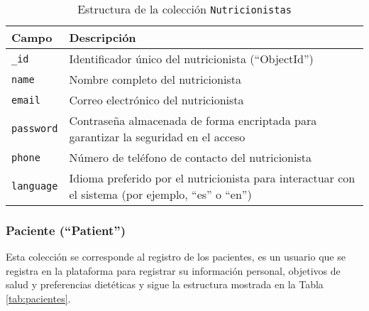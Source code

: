 \begin{table}[t]
    \centering
    \begin{tabular}{|l|p{10cm}|}
        \hline
        \textbf{Campo} & \textbf{Descripción} \\
        \hline
        \texttt{\_id} & Identificador único del nutricionista (``ObjectId'') \\
        \hline
        \texttt{name} & Nombre completo del nutricionista \\
        \hline
        \texttt{email} & Correo electrónico del nutricionista \\
        \hline
        \texttt{password} & Contraseña almacenada de forma encriptada para garantizar la seguridad en el acceso \\
        \hline
        \texttt{phone} & Número de teléfono de contacto del nutricionista \\
        \hline
        \texttt{language} & Idioma preferido por el nutricionista para interactuar con el sistema (por ejemplo, ``es'' o ``en'') \\
        \hline
    \end{tabular}
    \caption{Estructura de la colección \texttt{Nutricionistas}}
    \label{tab:nutritionistas}
\end{table}


\subsubsection{Paciente (``Patient'')}
Esta colección se corresponde al registro de los pacientes, es un usuario que se registra en la plataforma para registrar su información personal, objetivos de salud y preferencias dietéticas y sigue la estructura mostrada en la Tabla \ref{tab:pacientes}.

